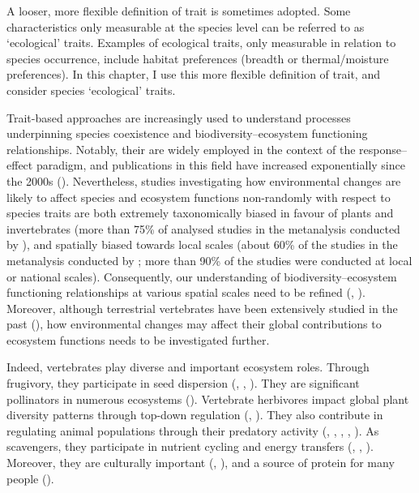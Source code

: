 A looser, more flexible definition of trait is sometimes adopted. Some characteristics only measurable at the species level can be referred to as `ecological' traits. Examples of ecological traits, only measurable in relation to species occurrence, include habitat preferences (breadth or thermal/moisture preferences). In this chapter, I use this more flexible definition of trait, and consider species `ecological' traits.

Trait-based approaches are increasingly used to understand processes underpinning species coexistence and biodiversity--ecosystem functioning relationships. Notably, their are widely employed in the context of the response--effect paradigm, and publications in this field have increased exponentially since the 2000s (\cite{Hevia2017}). Nevertheless, studies investigating how environmental changes are likely to affect species and ecosystem functions non-randomly with respect to species traits are both extremely taxonomically biased in favour of plants and invertebrates (more than 75\% of analysed studies in the metanalysis conducted by \cite{Hevia2017}), and spatially biased towards local scales (about 60\% of the studies in the metanalysis conducted by \cite{Hevia2017}; more than 90\% of the studies were conducted at local or national scales). Consequently, our understanding of biodiversity--ecosystem functioning relationships at various spatial scales need to be refined (\cite{Thompson2018}, \cite{Isbell2018}). Moreover, although terrestrial vertebrates have been extensively studied in the past (\cite{Titley2017}), how environmental changes may affect their global contributions to ecosystem functions needs to be investigated further. 

Indeed, vertebrates play diverse and important ecosystem roles. Through frugivory, they  participate in seed dispersion (\cite{Wandrag2015}, \cite{Mokany2014}, \cite{McConkey2012}). They are significant pollinators in numerous ecosystems (\cite{Ratto2018}). Vertebrate herbivores impact global plant diversity patterns through top-down regulation (\cite{Lin2018}, \cite{Zhang2018}). They also contribute in regulating animal populations through their predatory activity (\cite{Paine2016}, \cite{Luck2012}, \cite{Letnic2012}, \cite{Salo2010}, \cite{Barber2010}). As scavengers, they participate in nutrient cycling and energy transfers (\cite{Cunningham2018}, \cite{Inger2016}, \cite{Wilson2011}). Moreover, they are culturally important (\cite{Hirons}, \cite{Albert2018}), and a source of protein for many people (\cite{Alves2018}).

